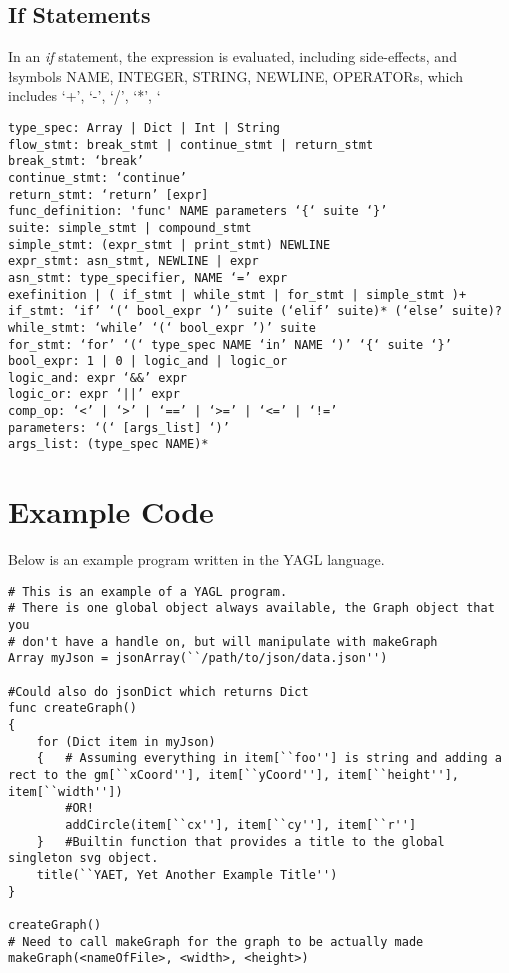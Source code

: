 \documentclass[12pt]{article}
\begin{document}
\subsection{If Statements}

In an \textit{if} statement, the expression is evaluated, including side-effects, and \l symbols NAME, INTEGER, STRING, NEWLINE, OPERATORs, which includes ‘+’, ‘-’, ‘/’, ‘*’, ‘%

\begin{lstlisting}
type_spec: Array | Dict | Int | String
flow_stmt: break_stmt | continue_stmt | return_stmt
break_stmt: ‘break’
continue_stmt: ‘continue’
return_stmt: ‘return’ [expr]
func_definition: 'func' NAME parameters ‘{‘ suite ‘}’
suite: simple_stmt | compound_stmt
simple_stmt: (expr_stmt | print_stmt) NEWLINE
expr_stmt: asn_stmt, NEWLINE | expr 
asn_stmt: type_specifier, NAME ‘=’ expr
exefinition | ( if_stmt | while_stmt | for_stmt | simple_stmt )+
if_stmt: ‘if’ ‘(‘ bool_expr ‘)’ suite (‘elif’ suite)* (‘else’ suite)?
while_stmt: ‘while’ ‘(‘ bool_expr ’)’ suite
for_stmt: ‘for’ ‘(‘ type_spec NAME ‘in’ NAME ‘)’ ‘{‘ suite ‘}’
bool_expr: 1 | 0 | logic_and | logic_or 
logic_and: expr ‘&&’ expr 
logic_or: expr ‘||’ expr 
comp_op: ‘<’ | ‘>’ | ‘==’ | ‘>=’ | ‘<=’ | ‘!=’
parameters: ‘(‘ [args_list] ‘)’
args_list: (type_spec NAME)*
\end{lstlisting}


\section{Example Code}
Below is an example program written in the YAGL language.

\begin{lstlisting}
# This is an example of a YAGL program. 
# There is one global object always available, the Graph object that you 
# don't have a handle on, but will manipulate with makeGraph
Array myJson = jsonArray(``/path/to/json/data.json'')

#Could also do jsonDict which returns Dict 
func createGraph()
{
    for (Dict item in myJson)
    {   # Assuming everything in item[``foo''] is string and adding a rect to the gm[``xCoord''], item[``yCoord''], item[``height''], item[``width''])
        #OR!
        addCircle(item[``cx''], item[``cy''], item[``r'']
    }   #Builtin function that provides a title to the global singleton svg object. 
    title(``YAET, Yet Another Example Title'')
}

createGraph()
# Need to call makeGraph for the graph to be actually made
makeGraph(<nameOfFile>, <width>, <height>)

\end{lstlisting}
\end{document}
